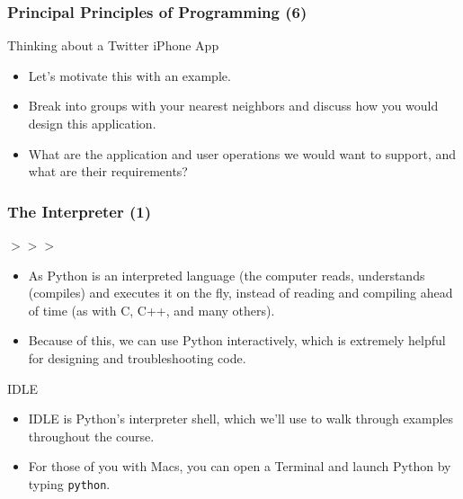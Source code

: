 \documentclass[10pt]{beamer}
\begin{document}
\begin{frame}
  \frametitle{Principal Principles of Programming (6)}
  \begin{block}{Thinking about a Twitter iPhone App}
    \begin{itemize}
      \item Let's motivate this with an example.
      \item Break into groups with your nearest neighbors and discuss how you would design this application.
      \item What are the application and user operations we would want to support, and what are their requirements?
    \end{itemize}
  \end{block}
\end{frame}

\begin{frame}
  \frametitle{The Interpreter (1)}
  \begin{block}{$>>>$}
    \begin{itemize}
      \item As Python is an interpreted language (the computer reads, understands (compiles) and executes it on the fly, instead of reading and compiling ahead of time (as with C, C++, and many others).
      \item Because of this, we can use Python interactively, which is extremely helpful for designing and troubleshooting code.
    \end{itemize}
  \end{block}
  \begin{block}{IDLE}
    \begin{itemize}
      \item IDLE is Python's interpreter shell, which we'll use to walk through examples throughout the course.
      \item For those of you with Macs, you can open a Terminal and launch Python by typing \texttt{python}.
    \end{itemize}
  \end{block}
\end{frame}
\end{document}
